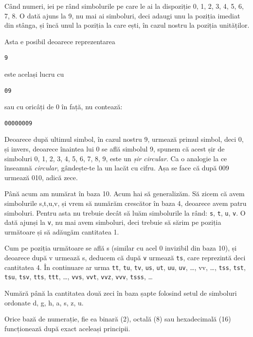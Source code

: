 Când numeri, iei pe rând simbolurile pe care le ai la dispoziție 0, 1, 2, 3, 4, 5, 6, 7, 8.
O dată ajuns la 9, nu mai ai simboluri, deci adaugi unu la poziția imediat din
stânga, și încă unul la poziția la care ești, în cazul nostru la poziția unităților.

Asta e posibil deoarece reprezentarea
\begin{verbatim}
9
\end{verbatim}
este același lucru cu
\begin{verbatim}
09
\end{verbatim}
sau cu oricâți de 0 în față, nu contează:
\begin{verbatim}
00000009
\end{verbatim}
Deoarece după ultimul simbol, în cazul nostru 9, urmează primul simbol, deci 0, și invers,
deoarece înaintea lui 0 se află simbolul 9, spunem că acest șir de simboluri
0, 1, 2, 3, 4, 5, 6, 7, 8, 9, este un \textsl{șir circular}. Ca o analogie
la ce înseamnă \textit{circular}, gândește-te la un lacăt cu cifru.
Așa se face că după 009 urmează 010, adică zece.

Până acum am numărat în baza 10. Acum hai să generalizăm. Să zicem că avem
simbolurile s,t,u,v, și vrem să numărăm crescător în baza 4, deoarece avem
patru simboluri. Pentru asta nu trebuie decât să luăm simbolurile la rând:
\texttt{s}, \texttt{t}, \texttt{u}, \texttt{v}.
O dată ajunși la \texttt{v}, nu mai avem simboluri, deci trebuie să sărim
pe poziția următoare și să adăugăm cantitatea 1.

Cum pe poziția următoare
se află s (similar cu acel 0 {\glqq}invizibil{\grqq} din baza 10), și deoarece după v
urmează s, deducem că după \texttt{v} urmează \texttt{ts}, care reprezintă
deci cantitatea 4. În continuare ar urma
\texttt{tt}, \texttt{tu}, \texttt{tv}, 
\texttt{us}, \texttt{ut}, \texttt{uu}, \texttt{uv}, \ldots, vv, \ldots,
\texttt{tss}, \texttt{tst}, \texttt{tsu}, \texttt{tsv},
\texttt{tts}, \texttt{ttt}, \ldots, \texttt{vvs}, \texttt{vvt},
\texttt{vvz}, \texttt{vvv}, \texttt{tsss}, \ldots

\begin{Exercise}[title={Numără în baza șapte},difficulty=2]
Numără până la cantitatea două zeci în baza șapte folosind setul
de simboluri ordonate d, g, h, a, s, z, u.
\end{Exercise}

Orice bază de numerație, fie ea binară (2), octală (8) sau
hexadecimală (16) funcționează după exact aceleași principii.

